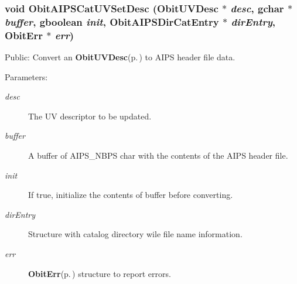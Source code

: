 \subsubsection{\setlength{\rightskip}{0pt plus 5cm}void Obit\-AIPSCat\-UVSet\-Desc ({\bf Obit\-UVDesc} $\ast$ {\em desc}, gchar $\ast$ {\em buffer}, gboolean {\em init}, {\bf Obit\-AIPSDir\-Cat\-Entry} $\ast$ {\em dir\-Entry}, {\bf Obit\-Err} $\ast$ {\em err})}\label{ObitAIPSCat_8c_a8}


Public: Convert an {\bf Obit\-UVDesc}{\rm (p.\,\pageref{structObitUVDesc})} to AIPS header file data. 

\begin{Desc}
\item[Parameters:]
\begin{description}
\item[{\em desc}]The UV descriptor to be updated. \item[{\em buffer}]A buffer of AIPS\_\-NBPS char with the contents of the AIPS header file. \item[{\em init}]If true, initialize the contents of buffer before converting. \item[{\em dir\-Entry}]Structure with catalog directory wile file name information. \item[{\em err}]{\bf Obit\-Err}{\rm (p.\,\pageref{structObitErr})} structure to report errors. \end{description}
\end{Desc}
